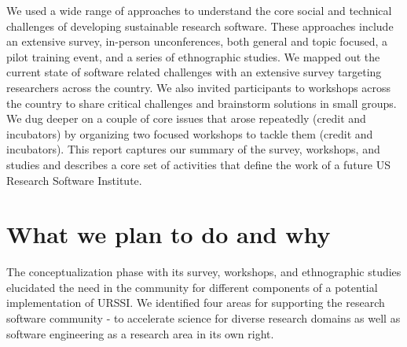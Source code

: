 \documentclass[
]{book}
\begin{document}
We used a wide range of approaches to understand the core social and technical challenges
of developing sustainable research software. These approaches include an extensive survey,
in-person unconferences, both general and topic focused, a pilot training event, and a
series of ethnographic studies. We mapped out the current state of software related
challenges with an extensive survey targeting researchers across the country. We also
invited participants to workshops across the country to share critical challenges and
brainstorm solutions in small groups. We dug deeper on a couple of core issues that arose
repeatedly (credit and incubators) by organizing two focused workshops to tackle them
(credit and incubators). This report captures our summary of the survey, workshops, and
studies and describes a core set of activities that define the work of a future US
Research Software Institute.

\hypertarget{what-we-plan-to-do-and-why}{%
\section{What we plan to do and why}\label{what-we-plan-to-do-and-why}}

The conceptualization phase with its survey, workshops, and ethnographic studies
elucidated the need in the community for different components of a potential
implementation of URSSI. We identified four areas for supporting the research software
community - to accelerate science for diverse research domains as well as software
engineering as a research area in its own right.
\end{document}
